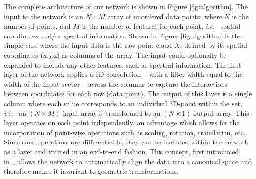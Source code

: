 \documentclass[final,3p,times,twocolumn,authoryear]{elsarticle}
\newcommand{\ie}{\textit{i}.\textit{e}.}
\begin{document}
The complete architecture of our network is shown in Figure \ref{fig:algorithm}. 
The input to the network is an $N\times M$ array of unordered data points, where $N$ is the number of points, and $M$ is the number of features for each point, \ie~ spatial coordinates and/or spectral information. 
Shown in Figure \ref{fig:algorithm} is the simple case where the input data is the raw point cloud $X$, defined by its spatial coordinates (x,y,z) as columns of the array. The input could optionally be expanded to include any other features, such as spectral information.
The first layer of the network applies a 1D-convolution -- with a filter width equal to the width of the input vector -- across the columns to capture the interactions between coordinates for each row (data point).
The output of this layer is a single column where each value corresponds to an individual 3D-point within the set, \ie~ an $(N\times M)$ input array is transformed to an $(N\times1)$ output array.  
This layer operates on each point independently, an advantage which allows for the incorporation of point-wise operations such as scaling, rotation, translation, etc. 
Since such operations are differentiable, they can be included within the network as a layer and trained in an end-to-end fashion. 
This concept, first introduced in~\citep{spatial_trans_net}, allows the network to automatically align the data into a canonical space and therefore makes it invariant to geometric transformations. 
\end{document}
